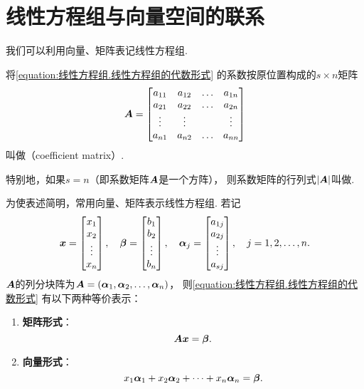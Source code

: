 \section{线性方程组与向量空间的联系}
我们可以利用向量、矩阵表记线性方程组.

\begin{definition}
将\cref{equation:线性方程组.线性方程组的代数形式} 的系数按原位置构成的\(s \times n\)矩阵\[
	\boldsymbol{A} = \begin{bmatrix}
		a_{11} & a_{12} & \dots & a_{1n} \\
		a_{21} & a_{22} & \dots & a_{2n} \\
		\vdots & \vdots & & \vdots \\
		a_{n1} & a_{n2} & \dots & a_{nn}
	\end{bmatrix}
\]叫做（coefficient matrix）.

特别地，如果\(s = n\)（即系数矩阵\(\boldsymbol{A}\)是一个方阵），
则系数矩阵的行列式\(\abs{\boldsymbol{A}}\)叫做.
\end{definition}

为使表述简明，常用向量、矩阵表示线性方程组.
若记\[
	\boldsymbol{x}=\begin{bmatrix}
		x_1 \\ x_2 \\ \vdots \\ x_n
	\end{bmatrix},
	\quad
	\boldsymbol\beta=\begin{bmatrix}
		b_1 \\ b_2 \\ \vdots \\ b_n
	\end{bmatrix},
	\quad
	\boldsymbol\alpha_j=\begin{bmatrix}
		a_{1j} \\ a_{2j} \\ \vdots \\ a_{sj}
	\end{bmatrix},
	\quad
	j=1,2,\dotsc,n.
\]
\(\boldsymbol{A}\)的列分块阵为\(\boldsymbol{A} = (\boldsymbol\alpha_1,\boldsymbol\alpha_2,\dotsc,\boldsymbol\alpha_n)\)，
则\cref{equation:线性方程组.线性方程组的代数形式} 有以下两种等价表示：
\begin{enumerate}
	\item {\rm\bf 矩阵形式}：
	\begin{equation}
		\boldsymbol{A} \boldsymbol{x} = \boldsymbol\beta.
	\end{equation}
	\item {\rm\bf 向量形式}：
	\begin{equation}
		x_1 \boldsymbol\alpha_1 + x_2 \boldsymbol\alpha_2 + \dotsb + x_n \boldsymbol\alpha_n = \boldsymbol\beta.
	\end{equation}
\end{enumerate}
